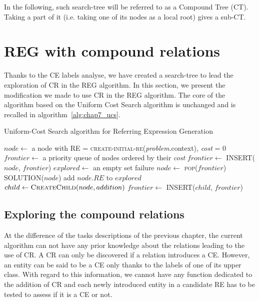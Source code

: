 In the following, such search-tree will be referred to as a Compound Tree (CT). Taking a part of it (i.e. taking one of its nodes as a local root) gives a sub-CT.

\section{REG with compound relations}

Thanks to the CE labels analyse, we have created a search-tree to lead the exploration of CR in the REG algorithm. In this section, we present the modification we made to use CR in the REG algorithm. The core of the algorithm based on the Uniform Cost Search algorithm is unchanged and is recalled in algorithm~\ref{alg:chap7_ucs}.

\begin{algorithm}[!ht]
\caption{Uniform-Cost Search algorithm for Referring Expression Generation}
\label{alg:chap7_ucs}
\begin{algorithmic}
    \State $node\leftarrow$ a node with RE = \textsc{create-initial-re}(\textit{problem}.context), \textit{cost} = 0
    \State $frontier\leftarrow$ a priority queue of nodes ordered by their \textit{cost}
    \State $frontier\leftarrow$ \textsc{INSERT}($node$, $frontier$)
    \State $explored\leftarrow$ an empty set
    \Loop
        	\State \Return failure
        \EndIf
        \State $node\leftarrow$ \textsc{pop}($frontier$)
        	\State \Return \textsc{SOLUTION}($node$)
        \EndIf
        \State add $node.RE$ to $explored$
            \State $child \leftarrow \textsc{CreateChild}(node, addition)$
            	\State $frontier\leftarrow$ \textsc{INSERT}($child$, $frontier$)
            \EndIf
        \EndFor
    \EndLoop
\EndFunction
\end{algorithmic}
\end{algorithm}

\subsection{Exploring the compound relations}

At the difference of the tasks descriptions of the previous chapter, the current algorithm can not have any prior knowledge about the relations leading to the use of CR. A CR can only be discovered if a relation introduces a CE. However, an entity can be said to be a CE only thanks to the labels of one of its upper class. With regard to this information, we cannot have any function dedicated to the addition of CR and each newly introduced entity in a candidate RE has to be tested to assess if it is a CE or not.

